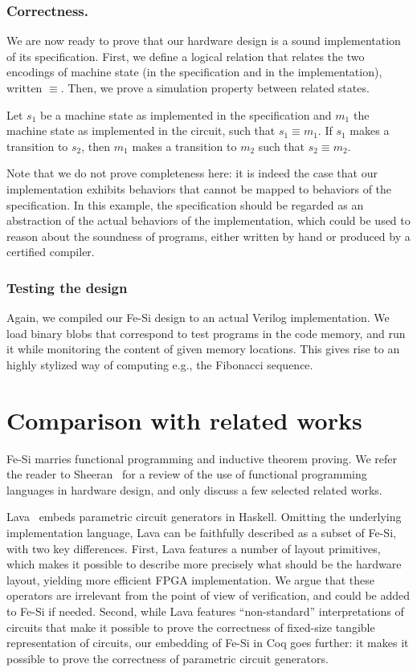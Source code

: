\documentclass{llncs}
\begin{document}
\subsubsection{Correctness.} We are now ready to prove that our
hardware design is a sound implementation of its specification. 
%
First, we define a logical relation that relates the two
encodings of machine state (in the specification and in the
implementation), written $\equiv$. 
%
Then, we prove a simulation property between related states.
\begin{theorem}
  Let $s_1$ be a machine state as implemented in the specification and
  $m_1$ the machine state as implemented in the circuit, such that
  $s_1 \equiv m_1$.
%
  If $s_1$ makes a transition to $s_2$, then $m_1$ makes a transition
  to $m_2$ such that $s_2 \equiv m_2$.
\end{theorem}
Note that we do not prove completeness here: it is indeed the case
that our implementation exhibits behaviors that cannot be mapped to
behaviors of the specification. 
%
In this example, the specification should be regarded as an
abstraction of the actual behaviors of the implementation, which could
be used to reason about the soundness of programs, either written by
hand or produced by a certified compiler.
%

\subsubsection{Testing the design}
Again, we compiled our Fe-Si design to an actual Verilog
implementation. We load binary blobs that correspond to test programs
in the code memory, and run it while monitoring the content of given
memory locations. This gives rise to an highly stylized way of
computing e.g., the Fibonacci sequence.

\section{Comparison with related works}\label{sec:rw}
Fe-Si marries functional programming and inductive theorem proving.
%
We refer the reader to Sheeran~\cite{DBLP:journals/jucs/Sheeran05} for
a review of the use of functional programming languages in hardware
design, and only discuss a few selected related works.

\medskip

Lava~\cite{Bjesse98lava:hardware} embeds parametric circuit generators
in Haskell. 
%
Omitting the underlying implementation language, Lava can be
faithfully described as a subset of Fe-Si, with two key differences.
%
First, Lava features a number of layout primitives, which makes it
possible to describe more precisely what should be the hardware
layout, yielding more efficient FPGA implementation. We argue that
these operators are irrelevant from the point of view of verification,
and could be added to Fe-Si if needed.
%
Second, while Lava features ``non-standard'' interpretations of
circuits that make it possible to prove the correctness of fixed-size
tangible representation of circuits, our embedding of Fe-Si in Coq
goes further: it makes it possible to prove the correctness of
parametric circuit generators.
\end{document}
